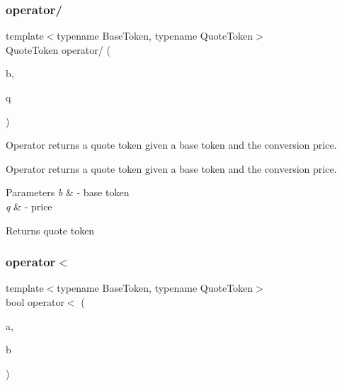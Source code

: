 \subsubsection{\texorpdfstring{operator/}{operator/}}
{\footnotesize\ttfamily template$<$typename Base\+Token, typename Quote\+Token$>$ \\
Quote\+Token operator/ (\begin{DoxyParamCaption}\item[{Base\+Token}]{b,  }\item[{const \mbox{\hyperlink{structaacio_1_1price}{price}}$<$ Base\+Token, Quote\+Token $>$ \&}]{q }\end{DoxyParamCaption})\hspace{0.3cm}{\ttfamily [friend]}}



Operator returns a quote token given a base token and the conversion price. 

Operator returns a quote token given a base token and the conversion price. 
\begin{DoxyParams}{Parameters}
{\em b} & -\/ base token \\
\hline
{\em q} & -\/ price \\
\hline
\end{DoxyParams}
\begin{DoxyReturn}{Returns}
quote token 
\end{DoxyReturn}
\mbox{\label{structaacio_1_1price_aa6a0b37090470580bca05624bd5da0a3}} 
\subsubsection{\texorpdfstring{operator$<$}{operator<}}
{\footnotesize\ttfamily template$<$typename Base\+Token, typename Quote\+Token$>$ \\
bool operator$<$ (\begin{DoxyParamCaption}\item[{const \mbox{\hyperlink{structaacio_1_1price}{price}}$<$ Base\+Token, Quote\+Token $>$ \&}]{a,  }\item[{const \mbox{\hyperlink{structaacio_1_1price}{price}}$<$ Base\+Token, Quote\+Token $>$ \&}]{b }\end{DoxyParamCaption})\hspace{0.3cm}{\ttfamily [friend]}}



